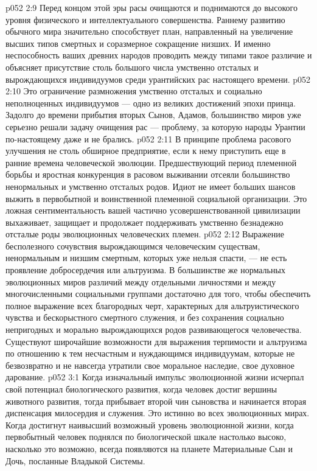 \vs p052 2:9 \pc Перед концом этой эры расы очищаются и поднимаются до высокого уровня физического и интеллектуального совершенства. Раннему развитию обычного мира значительно способствует план, направленный на увеличение высших типов смертных и соразмерное сокращение низших. И именно неспособность ваших древних народов проводить между типами такое различие и объясняет присутствие столь большого числа умственно отсталых и вырождающихся индивидуумов среди урантийских рас настоящего времени.
\vs p052 2:10 Это ограничение размножения умственно отсталых и социально неполноценных индивидуумов --- одно из великих достижений эпохи принца. Задолго до времени прибытия вторых Сынов, Адамов, большинство миров уже серьезно решали задачу очищения рас --- проблему, за которую народы Урантии по\hyp{}настоящему даже и не брались.
\vs p052 2:11 В принципе проблема расового улучшения не столь обширное предприятие, если к нему приступить еще в ранние времена человеческой эволюции. Предшествующий период племенной борьбы и яростная конкуренция в расовом выживании отсеяли большинство ненормальных и умственно отсталых родов. Идиот не имеет больших шансов выжить в первобытной и воинственной племенной социальной организации. Это ложная сентиментальность вашей частично усовершенствованной цивилизации выхаживает, защищает и продолжает поддерживать умственно безнадежно отсталые роды эволюционных человеческих племен.
\vs p052 2:12 Выражение бесполезного сочувствия вырождающимся человеческим существам, ненормальным и низшим смертным, которых уже нельзя спасти, --- не есть проявление добросердечия или альтруизма. В большинстве же нормальных эволюционных миров различий между отдельными личностями и между многочисленными социальными группами достаточно для того, чтобы обеспечить полное выражение всех благородных черт, характерных для альтруистического чувства и бескорыстного смертного служения, и без сохранения социально непригодных и морально вырождающихся родов развивающегося человечества. Существуют широчайшие возможности для выражения терпимости и альтруизма по отношению к тем несчастным и нуждающимся индивидуумам, которые не безвозвратно и не навсегда утратили свое моральное наследие, свое духовное дарование.
\vs p052 3:1 Когда изначальный импульс эволюционной жизни исчерпал свой потенциал биологического развития, когда человек достиг вершины животного развития, тогда прибывает второй чин сыновства и начинается вторая диспенсация милосердия и служения. Это истинно во всех эволюционных мирах. Когда достигнут наивысший возможный уровень эволюционной жизни, когда первобытный человек поднялся по биологической шкале настолько высоко, насколько это возможно, всегда появляются на планете Материальные Сын и Дочь, посланные Владыкой Системы.

